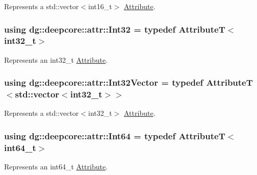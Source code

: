 Represents a {\ttfamily std\+::vector$<$int16\+\_\+t$>$} \hyperlink{classdg_1_1deepcore_1_1_attribute}{Attribute}. 

\subsubsection[{\texorpdfstring{Int32}{Int32}}]{\setlength{\rightskip}{0pt plus 5cm}using {\bf dg\+::deepcore\+::attr\+::\+Int32} = typedef AttributeT$<$int32\+\_\+t$>$}\hypertarget{group___process_attributes_ga2c454952beddca2ef5ee37964bf022a7}{}\label{group___process_attributes_ga2c454952beddca2ef5ee37964bf022a7}


Represents an {\ttfamily int32\+\_\+t} \hyperlink{classdg_1_1deepcore_1_1_attribute}{Attribute}. 

\subsubsection[{\texorpdfstring{Int32\+Vector}{Int32Vector}}]{\setlength{\rightskip}{0pt plus 5cm}using {\bf dg\+::deepcore\+::attr\+::\+Int32\+Vector} = typedef AttributeT$<$std\+::vector$<$int32\+\_\+t$>$$>$}\hypertarget{group___process_attributes_ga15cc64e18c8f44a864d1844375a7329a}{}\label{group___process_attributes_ga15cc64e18c8f44a864d1844375a7329a}


Represents a {\ttfamily std\+::vector$<$int32\+\_\+t$>$} \hyperlink{classdg_1_1deepcore_1_1_attribute}{Attribute}. 

\subsubsection[{\texorpdfstring{Int64}{Int64}}]{\setlength{\rightskip}{0pt plus 5cm}using {\bf dg\+::deepcore\+::attr\+::\+Int64} = typedef AttributeT$<$int64\+\_\+t$>$}\hypertarget{group___process_attributes_gacab5ef809f8f2f471dfe6e40eaf1b36f}{}\label{group___process_attributes_gacab5ef809f8f2f471dfe6e40eaf1b36f}


Represents an {\ttfamily int64\+\_\+t} \hyperlink{classdg_1_1deepcore_1_1_attribute}{Attribute}. 

